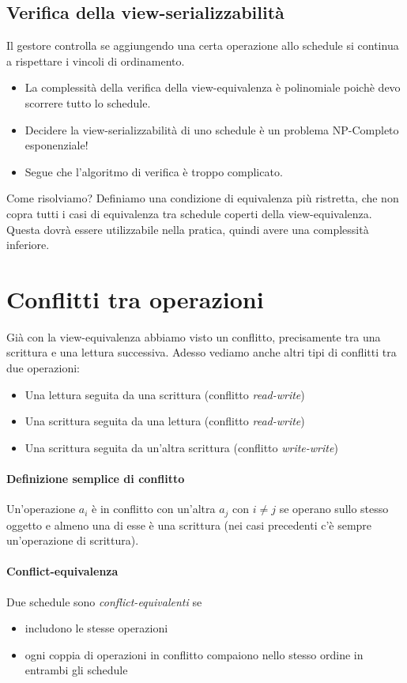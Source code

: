 \subsection{Verifica della view-serializzabilità} Il gestore controlla se aggiungendo una certa operazione allo schedule si continua a rispettare i vincoli di ordinamento.
\begin{itemize}
	\item La complessità della verifica della view-equivalenza è polinomiale poichè devo scorrere tutto lo schedule. 
	\item Decidere la view-serializzabilità di uno schedule è un problema NP-Completo esponenziale! 
	\item Segue che l'algoritmo di verifica è troppo complicato.
\end{itemize}
Come risolviamo? Definiamo una condizione di equivalenza più ristretta, che non copra tutti i casi di equivalenza tra schedule coperti della view-equivalenza. Questa dovrà essere utilizzabile nella pratica, quindi avere una complessità inferiore.

\section{Conflitti tra operazioni}
Già con la view-equivalenza abbiamo visto un conflitto, precisamente tra una scrittura e una lettura successiva. Adesso vediamo anche altri tipi di conflitti tra due operazioni:
\begin{itemize}
	\item Una lettura seguita da una scrittura (conflitto \emph{read-write})
	\item Una scrittura seguita da una lettura (conflitto \emph{read-write})
	\item Una scrittura seguita da un'altra scrittura (conflitto \emph{write-write})
\end{itemize}
\paragraph{Definizione semplice di conflitto} Un'operazione $a_i$ è in conflitto con un'altra $a_j$ con $i\neq j$ se operano sullo stesso oggetto e almeno una di esse è una scrittura (nei casi precedenti c'è sempre un'operazione di scrittura). 
\paragraph{Conflict-equivalenza} Due schedule sono \emph{conflict-equivalenti} se
\begin{itemize}
	\item includono le stesse operazioni
	\item ogni coppia di operazioni in conflitto compaiono nello stesso ordine in entrambi gli schedule
\end{itemize}
